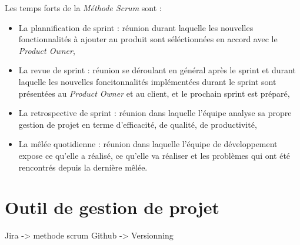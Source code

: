		Les temps forts de la \textit{Méthode Scrum} sont :

		\begin{itemize}
			\item La plannification de sprint : réunion durant laquelle les nouvelles fonctionnalités à ajouter au produit sont séléctionnées en accord avec le \textit{Product Owner},
			\item La revue de sprint : réunion se déroulant en général après le sprint et durant laquelle les nouvelles foncitonnalités implémentées durant le sprint sont présentées au \textit{Product Owner} et au client, et le prochain sprint est préparé,
			\item La retrospective de sprint : réunion dans laquelle l'équipe analyse sa propre gestion de projet en terme d'efficacité, de qualité, de productivité,
			\item La mêlée quotidienne : réunion dans laquelle l'équipe de développement expose ce qu'elle a réalisé, ce qu'elle va réaliser et les problèmes qui ont été rencontrés depuis la dernière mêlée.
		\end{itemize}
	
		

	\section{Outil de gestion de projet}
		Jira -> methode scrum
		Github -> Versionning
	